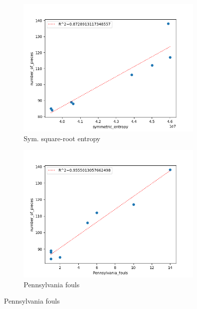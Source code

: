 \documentclass{mgggarticle}
\begin{document}
\begin{figure}
\begin{subfigure}{0.4\textwidth}
\centering
\includegraphics[width=\textwidth]{figs/scatters/syment.png}
\caption{Sym. square-root entropy}
\end{subfigure}
\begin{subfigure}{0.4\textwidth}
\centering
\includegraphics[width=\textwidth]{figs/scatters/Penn.png}
\caption{Pennsylvania fouls}
\end{subfigure}


\end{figure}
\end{document}
